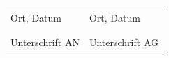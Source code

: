 \documentclass[11pt,a4paper]{article}
\begin{document}
\vfill
\begin{tabular}{p{}p{}}
\hrulefill & \hrulefill \\
Ort, Datum & Ort, Datum \\
\\[3cm]
\hrulefill & \hrulefill \\
Unterschrift AN & Unterschrift AG \\
\end{tabular}
\end{document}
